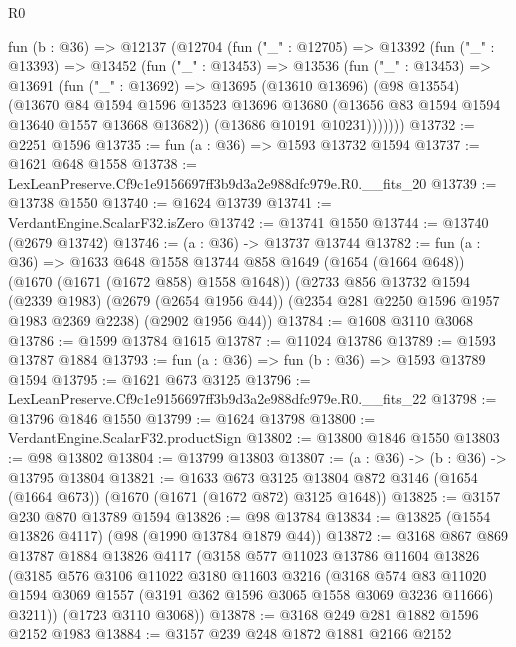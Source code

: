 \begin{lexlean}{R0}
\begin{coremodule}
  fun (b : @36) =>
  @12137
    (@12704
      (fun ("_" : @12705) =>
      @13392
        (fun ("_" : @13393) =>
        @13452
          (fun ("_" : @13453) =>
          @13536
            (fun ("_" : @13453) =>
            @13691
              (fun ("_" : @13692) =>
              @13695
                (@13610 @13696)
                (@98 @13554)
                (@13670
                  @84
                  @1594
                  @1596
                  @13523
                  @13696
                  @13680
                  (@13656 @83 @1594 @1594 @13640 @1557 @13668 @13682))
                (@13686 @10191 @10231)))))))
@13732 := @2251 @1596
@13735 := fun (a : @36) => @1593 @13732 @1594
@13737 := @1621 @648 @1558
@13738 := LexLeanPreserve.Cf9c1e9156697ff3b9d3a2e988dfc979e.R0.__fits_20
@13739 := @13738 @1550
@13740 := @1624 @13739
@13741 := VerdantEngine.ScalarF32.isZero
@13742 := @13741 @1550
@13744 := @13740 (@2679 @13742)
@13746 := (a : @36) -> @13737 @13744
@13782 := fun (a : @36) =>
  @1633
    @648
    @1558
    @13744
    @858
    @1649
    (@1654 (@1664 @648))
    (@1670 (@1671 (@1672 @858) @1558 @1648))
    (@2733
      @856
      @13732
      @1594
      (@2339 @1983)
      (@2679 (@2654 @1956 @44))
      (@2354 @281 @2250 @1596 @1957 @1983 @2369 @2238)
      (@2902 @1956 @44))
@13784 := @1608 @3110 @3068
@13786 := @1599 @13784 @1615
@13787 := @11024 @13786
@13789 := @1593 @13787 @1884
@13793 := fun (a : @36) => fun (b : @36) => @1593 @13789 @1594
@13795 := @1621 @673 @3125
@13796 := LexLeanPreserve.Cf9c1e9156697ff3b9d3a2e988dfc979e.R0.__fits_22
@13798 := @13796 @1846 @1550
@13799 := @1624 @13798
@13800 := VerdantEngine.ScalarF32.productSign
@13802 := @13800 @1846 @1550
@13803 := @98 @13802
@13804 := @13799 @13803
@13807 := (a : @36) -> (b : @36) -> @13795 @13804
@13821 := @1633
    @673
    @3125
    @13804
    @872
    @3146
    (@1654 (@1664 @673))
    (@1670 (@1671 (@1672 @872) @3125 @1648))
@13825 := @3157 @230 @870 @13789 @1594
@13826 := @98 @13784
@13834 := @13825 (@1554 @13826 @4117) (@98 (@1990 @13784 @1879 @44))
@13872 := @3168
    @867
    @869
    @13787
    @1884
    @13826
    @4117
    (@3158
      @577
      @11023
      @13786
      @11604
      @13826
      (@3185
        @576
        @3106
        @11022
        @3180
        @11603
        @3216
        (@3168
          @574
          @83
          @11020
          @1594
          @3069
          @1557
          (@3191 @362 @1596 @3065 @1558 @3069 @3236 @11666)
          @3211))
      (@1723 @3110 @3068))
@13878 := @3168 @249 @281 @1882 @1596 @2152 @1983
@13884 := @3157 @239 @248 @1872 @1881 @2166 @2152

\end{coremodule}
\end{lexlean}

